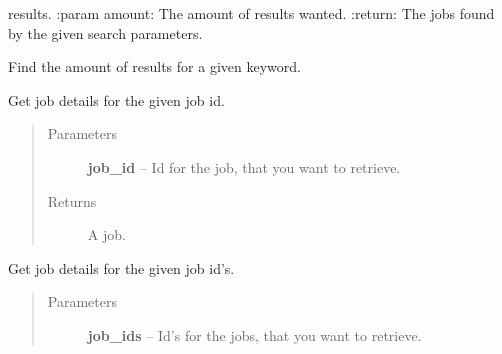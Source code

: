 \documentclass[letterpaper,10pt,english]{sphinxmanual}
\begin{document}
\begin{fulllineitems}
\begin{fulllineitems}
\begin{quote}
\begin{description}
\end{description}\end{quote}

results.
:param amount: The amount of results wanted.
:return: The jobs found by the given search parameters.

\end{fulllineitems}


\begin{fulllineitems}
\label{job_searcher:job_searcher.go_jobs.GoJobs.find_results_amount}
Find the amount of results for a given keyword.

\end{fulllineitems}


\begin{fulllineitems}
\label{job_searcher:job_searcher.go_jobs.GoJobs.get_details_for_job}
Get job details for the given job id.
\begin{quote}\begin{description}
\item[{Parameters}] \leavevmode
\textbf{job\_id} -- Id for the job, that you want to retrieve.

\item[{Returns}] \leavevmode
A job.

\end{description}\end{quote}

\end{fulllineitems}


\begin{fulllineitems}
\label{job_searcher:job_searcher.go_jobs.GoJobs.get_details_for_jobs}
Get job details for the given job id's.
\begin{quote}\begin{description}
\item[{Parameters}] \leavevmode
\textbf{job\_ids} -- Id's for the jobs, that you want to retrieve.


\end{description}
\end{quote}
\end{fulllineitems}
\end{fulllineitems}
\end{document}
